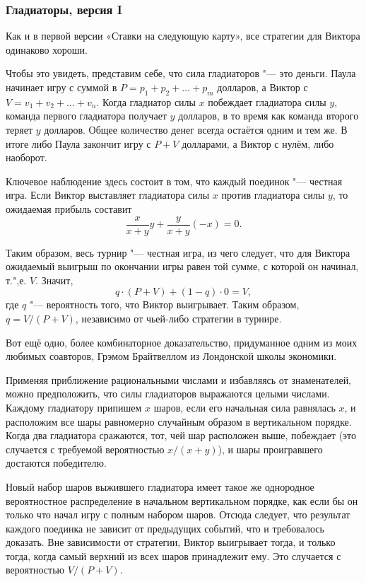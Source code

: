 \documentclass[twoside]{book}
\begin{document}
\subsubsection*{Гладиаторы, версия I}%

Как и в первой версии «Ставки на следующую карту», все стратегии для Виктора одинаково хороши.

Чтобы это увидеть, представим себе, что сила гладиаторов "--- это деньги.
Паула начинает игру с суммой в $P = p_1 + p_2 + \ldots + p_m$ долларов, 
а Виктор с $V = v_1 + v_2 + \ldots + v_n$.
Когда гладиатор силы $x$ побеждает гладиатора силы $y$, команда первого гладиатора получает $y$ долларов, в то время как команда второго теряет $y$ долларов.
Общее количество денег всегда остаётся одним и тем же.
В итоге либо Паула закончит игру с $P+V$ долларами, а Виктор с нулём, либо наоборот.

Ключевое наблюдение здесь состоит в том, что каждый поединок "--- честная игра.
Если Виктор выставляет гладиатора силы $x$ против гладиатора силы $y$, то ожидаемая прибыль составит 
\[\frac{x}{x+y}y + \frac{y}{x+y}(-x) =0.\]

Таким образом, весь турнир "--- честная игра, из чего следует, что для Виктора ожидаемый выигрыш по окончании игры равен той сумме, с которой он начинал, т.",е. $V$. %
Значит,
\[q\cdot(P + V) + (1-q)\cdot0 = V,\]
где $q$ "--- вероятность того, что Виктор выигрывает.
Таким образом, $q = V/(P+V)$,
независимо от чьей-либо стратегии в турнире.
\heart

Вот ещё одно, более комбинаторное доказательство, придуманное одним из моих любимых соавторов, Грэмом Брайтвеллом из Лондонской школы экономики. %

Применяя приближение рациональными числами и избавляясь от знаменателей, можно предположить, что силы гладиаторов выражаются целыми числами.
Каждому гладиатору припишем $x$ шаров, если его начальная сила равнялась $x$, и расположим все шары равномерно случайным образом в вертикальном порядке.
Когда два гладиатора сражаются, тот, чей шар расположен выше, побеждает (это случается с требуемой вероятностью $x/(x+y)$), и шары проигравшего достаются победителю.

Новый набор шаров выжившего гладиатора имеет такое же однородное вероятностное распределение в начальном вертикальном порядке, как если бы он только что начал игру с полным набором шаров.
Отсюда следует, что результат каждого поединка не зависит от предыдущих событий, что и требовалось доказать.
Вне зависимости от стратегии, Виктор выигрывает тогда, и только тогда, когда самый верхний из всех шаров принадлежит ему.
Это случается с вероятностью $V/(P+V)$.
\end{document}
